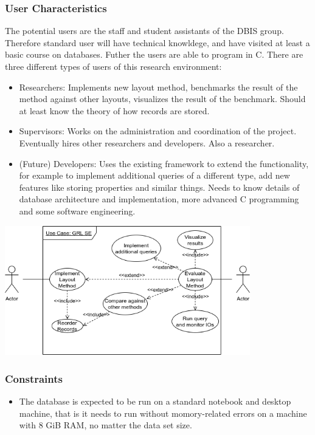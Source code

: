 	\subsubsection{User Characteristics}
		The potential users are the staff and student assistants of the DBIS group. Therefore standard user will have technical knowldege, and have visited at least a basic course on databases. Futher the users are able to program in C.
		There are three different types of users of this research environment: \\
		\begin{itemize}
			\item Researchers: Implements new layout method, benchmarks the result of the method against other layouts, visualizes the result of the benchmark. Should at least know the theory of how records are stored.
			
		 	\item Supervisors: Works on the administration and coordination of the project. Eventually hires other researchers and developers. Also a researcher.
		 	\item (Future) Developers: Uses the existing framework to extend the functionality, for example to implement additional queries of a different type, add new features like storing properties and similar things. Needs to know details of database architecture and implementation, more advanced C programming and some software engineering.
		\end{itemize}
		\begin{center}
		 \includegraphics[keepaspectratio,width=0.8\textwidth]{img/use_case.png}
		\end{center}

	\subsubsection{Constraints}
		\begin{itemize}
			\item The database is expected to be run on a standard notebook and desktop machine, that is it needs to run without momory-related errors on a machine with 8 GiB RAM, no matter the data set size.
		\end{itemize}

